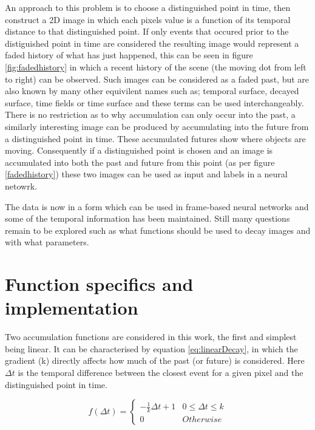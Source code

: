 An approach to this problem is to choose a distinguished point in time, then construct a 2D image in which each pixels value is a function of its temporal distance to that distinguished point.
If only events that occured prior to the distiguished point in time are considered the resulting image would represent a faded history of what has just happened, this can be seen in figure \ref{fig:fadedhistory} in which a recent history of the scene (the moving dot from left to right) can be observed. 
Such images can be considered as a faded past, but are also known by many other equivilent names such as; temporal surface, decayed surface, time fields or time surface and these terms can be used interchangeably. 
There is no restriction as to why accumulation can only occur into the past, a similarly interesting image can be produced by accumulating into the future from a distinguished point in time.
These accumulated futures show where objects are moving. 
Consequently if a distinguished point is chosen and an image is accumulated into both the past and future from this point (as per figure \ref{fadedhistory}) these two images can be used as input and labels in a neural netowrk. 


The data is now in a form which can be used in frame-based neural networks and some of the temporal information has been maintained.
Still many questions remain to be explored such as what functions should be used to decay images and with what parameters.


\section{Function specifics and implementation}

Two accumulation functions are considered in this work, the first and simplest being linear. 
It can be characterised by equation \ref{eq:linearDecay}, in which the gradient (k) directly affects how much of the past (or future) is considered. 
Here $\Delta t$ is the temporal difference between the closest event for a given pixel and the distinguished point in time. 


\begin{equation}
 \label{eq:linearDecay}
    f(\Delta t) = 
    \begin{cases}
    -\frac{1}{k}  \Delta t + 1 & 0\leq \Delta t \leq k \\
    0 & Otherwise
   \end{cases}
\end{equation}

